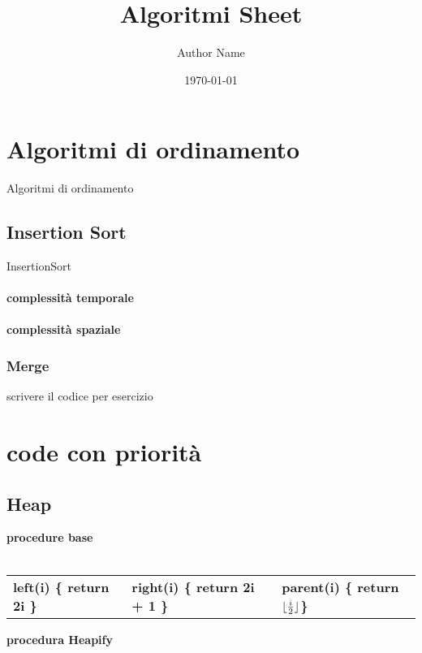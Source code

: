 \documentclass{article}
\title{Algoritmi Sheet}
\author{Author Name}
\date{\today}
\DeclarePairedDelimiter\floor{\lfloor}{\rfloor}
\begin{document}
\maketitle

\section{Algoritmi di ordinamento}
Algoritmi di ordinamento 
\subsection{Insertion Sort}
\IncMargin{1em} %
\begin{algorithm}[H] 
\SetAlgoLined
\caption{InsertionSort\label{IR}}
\end{algorithm}

\paragraph{complessità temporale}
\paragraph{complessità spaziale}

\newpage

\subsubsection{Merge}


scrivere il codice per esercizio

\begin{algorithm}
\SetAlgoLined
{}
\end{algorithm}


\newpage

\section{code con priorità}
\subsection{Heap}

\textbf{procedure base} 
\\
\\
\begin{tabular}{|l|l|l|}

\textbf{left(i) \{ return 2i \} } 
& \textbf{right(i) \{ return 2i + 1 \} }
& \textbf{parent(i) \{ return $\floor{\frac{i}{2}}$\}} \\
\end{tabular}

\textbf{procedura Heapify}
\begin{algorithm}
    
\end{algorithm}
\end{document}

